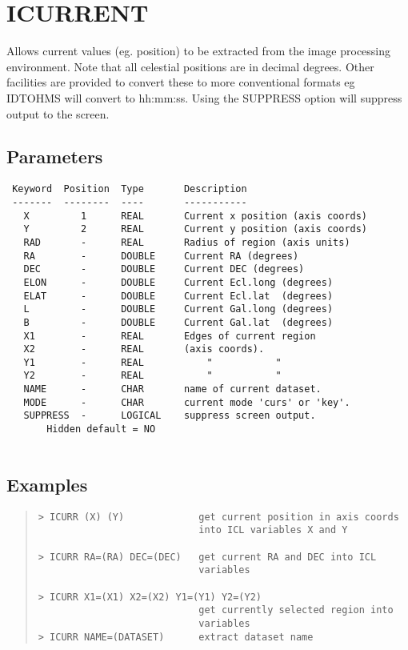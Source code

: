 \documentclass{book}
\renewcommand{\_}{{\tt\char'137}}     %
\begin{document}
\section{ICURRENT}
Allows current values (eg. position) to be extracted from the image
processing environment. Note that all celestial positions are
in decimal degrees. Other facilities are provided to convert these
to more conventional formats eg IDTOHMS will convert to hh:mm:ss.
Using the SUPPRESS option will suppress output to the screen.
 
\subsection{Parameters}
\begin{verbatim}
 Keyword  Position  Type       Description
 -------  --------  ----       -----------
   X         1      REAL       Current x position (axis coords)
   Y         2      REAL       Current y position (axis coords)
   RAD       -      REAL       Radius of region (axis units)
   RA        -      DOUBLE     Current RA (degrees)
   DEC       -      DOUBLE     Current DEC (degrees)
   ELON      -      DOUBLE     Current Ecl.long (degrees)
   ELAT      -      DOUBLE     Current Ecl.lat  (degrees)
   L         -      DOUBLE     Current Gal.long (degrees)
   B         -      DOUBLE     Current Gal.lat  (degrees)
   X1        -      REAL       Edges of current region
   X2        -      REAL       (axis coords).
   Y1        -      REAL           "           "
   Y2        -      REAL           "           "
   NAME      -      CHAR       name of current dataset.
   MODE      -      CHAR       current mode 'curs' or 'key'.
   SUPPRESS  -      LOGICAL    suppress screen output.
       Hidden default = NO
 
\end{verbatim}\subsection{Examples}
\begin{quote}\begin{verbatim}
> ICURR (X) (Y)             get current position in axis coords
                            into ICL variables X and Y
 
> ICURR RA=(RA) DEC=(DEC)   get current RA and DEC into ICL
                            variables
 
> ICURR X1=(X1) X2=(X2) Y1=(Y1) Y2=(Y2)
                            get currently selected region into
                            variables
> ICURR NAME=(DATASET)      extract dataset name
\end{verbatim}\end{quote}
\end{document}

